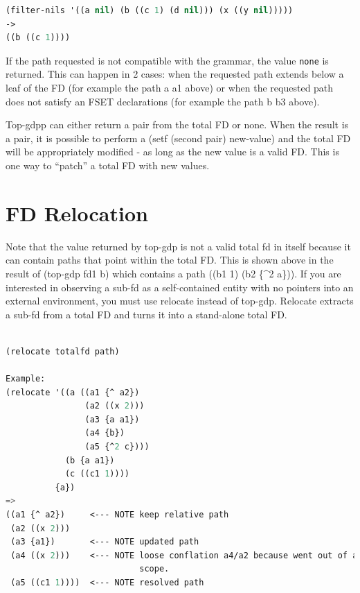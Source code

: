 \documentclass[10pt,a4paper]{report}
\begin{document}
\begin{lstlisting}[language=Lisp]
(filter-nils '((a nil) (b ((c 1) (d nil))) (x ((y nil)))))
->
((b ((c 1))))
\end{lstlisting}


If the path requested is not compatible with the grammar, the value
{\tt none} is returned.  This can happen in 2 cases: when the requested path
extends below a leaf of the FD (for example the path {a a1} above) or when
the requested path does not satisfy an FSET declarations (for example the
path {b b3} above).

Top-gdpp can either return a pair from the total FD or none.  When the
result is a pair, it is possible to perform a (setf (second pair)
new-value) and the total FD will be appropriately modified - as long as the
new value is a valid FD.  This is one way to ``patch'' a total FD with new
values. 


\section{FD Relocation}

Note that the value returned by top-gdp is not a valid total fd in itself
because it can contain paths that point within the total FD.  This is shown
above in the result of (top-gdp fd1 {b}) which contains a path ((b1 1) (b2
\{\^{}2 a\})).  If you are interested in observing a sub-fd as a self-contained
entity with no pointers into an external environment, you must use relocate
instead of top-gdp.  Relocate extracts a sub-fd from a total FD and turns
it into a stand-alone total FD.  

\begin{lstlisting}[language=Lisp]

(relocate totalfd path)

Example:
(relocate '((a ((a1 {^ a2})
                (a2 ((x 2)))
                (a3 {a a1})
                (a4 {b})
                (a5 {^2 c})))
            (b {a a1})
            (c ((c1 1))))
          {a})
=>
((a1 {^ a2})     <--- NOTE keep relative path
 (a2 ((x 2)))
 (a3 {a1})       <--- NOTE updated path
 (a4 ((x 2)))    <--- NOTE loose conflation a4/a2 because went out of a
                           scope.
 (a5 ((c1 1))))  <--- NOTE resolved path

\end{lstlisting}
\end{document}
